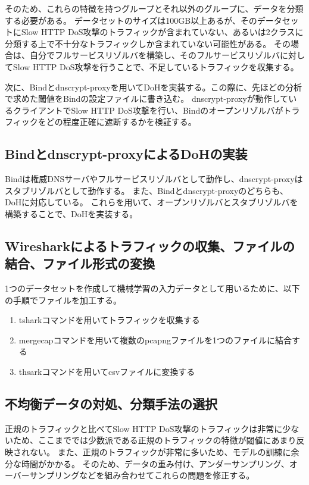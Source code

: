 \documentclass[twocolumn,article]{jlreq}
\begin{document}
そのため、これらの特徴を持つグループとそれ以外のグループに、データを分類する必要がある。%
データセットのサイズは100GB以上あるが、そのデータセットにSlow HTTP DoS攻撃のトラフィックが含まれていない、あるいは2クラスに分類する上で不十分なトラフィックしか含まれていない可能性がある。%
その場合は、自分でフルサービスリゾルバを構築し、そのフルサービスリゾルバに対してSlow HTTP DoS攻撃を行うことで、不足しているトラフィックを収集する。%

次に、Bindとdnscrypt-proxyを用いてDoHを実装する。この際に、先ほどの分析で求めた閾値をBindの設定ファイルに書き込む。%
dnscrypt-proxyが動作しているクライアントでSlow HTTP DoS攻撃を行い、Bindのオープンリゾルバがトラフィックをどの程度正確に遮断するかを検証する。

\subsection{Bindとdnscrypt-proxyによるDoHの実装}
Bindは権威DNSサーバやフルサービスリゾルバとして動作し、dnscrypt-proxyはスタブリゾルバとして動作する。%
また、Bindとdnscrypt-proxyのどちらも、DoHに対応している。%
これらを用いて、オープンリゾルバとスタブリゾルバを構築することで、DoHを実装する。

\subsection{Wiresharkによるトラフィックの収集、ファイルの結合、ファイル形式の変換}
1つのデータセットを作成して機械学習の入力データとして用いるために、以下の手順でファイルを加工する。%

\begin{enumerate}
  \item tsharkコマンドを用いてトラフィックを収集する
  \item mergecapコマンドを用いて複数のpcapngファイルを1つのファイルに結合する
  \item thsarkコマンドを用いてcsvファイルに変換する
\end{enumerate}

\subsection{不均衡データの対処、分類手法の選択}
正規のトラフィックと比べてSlow HTTP DoS攻撃のトラフィックは非常に少ないため、ここまででは少数派である正規のトラフィックの特徴が閾値にあまり反映されない。%
また、正規のトラフィックが非常に多いため、モデルの訓練に余分な時間がかかる。%
そのため、データの重み付け、アンダーサンプリング、オーバーサンプリングなどを組み合わせてこれらの問題を修正する。%
\end{document}
